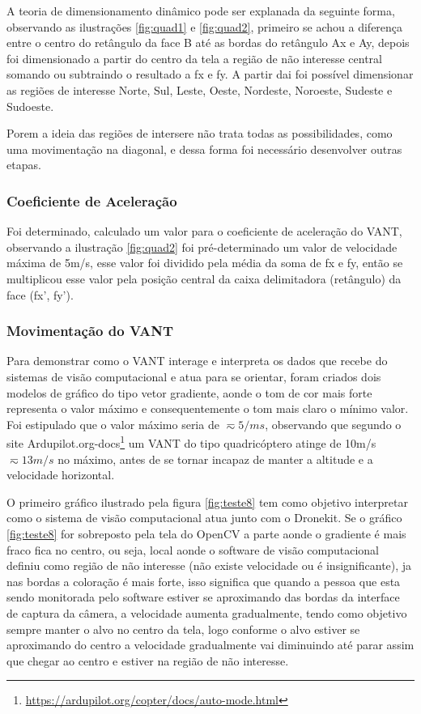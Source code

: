 A teoria de dimensionamento dinâmico pode ser explanada da seguinte forma, observando as ilustrações \ref{fig:quad1} e \ref{fig:quad2}, primeiro se achou a diferença entre o centro do retângulo da face B até as bordas do retângulo Ax e Ay, depois foi dimensionado a partir do centro da tela a região de não interesse central somando ou subtraindo o resultado a fx e fy. A partir dai foi possível dimensionar as regiões de interesse Norte, Sul, Leste, Oeste, Nordeste, Noroeste, Sudeste e Sudoeste.

Porem a ideia das regiões de intersere não trata todas as possibilidades, como uma movimentação na diagonal, e dessa forma foi necessário desenvolver outras etapas.

\subsubsection{Coeficiente de Aceleração}

Foi determinado, calculado um valor para o coeficiente de aceleração do VANT, observando a ilustração \ref{fig:quad2} foi pré-determinado um valor de velocidade máxima de 5m/s, esse valor foi dividido pela média da soma de fx e fy, então se multiplicou esse valor pela posição central da caixa delimitadora (retângulo) da face (fx', fy'). 

\subsubsection{Movimentação do VANT}

Para demonstrar como o VANT interage e interpreta os dados que recebe do sistemas de visão computacional e atua para se orientar, foram criados dois modelos de gráfico do tipo vetor gradiente, aonde o tom de cor mais forte representa o valor máximo e consequentemente o tom mais claro o mínimo valor. Foi estipulado que o valor máximo seria de $\displaystyle \eqsim 5/ms$, observando que segundo o site Ardupilot.org-docs\footnote{\url{https://ardupilot.org/copter/docs/auto-mode.html}} um VANT do tipo quadricóptero atinge de 10m/s $\displaystyle \eqsim13m/s$ no máximo, antes de se tornar incapaz de manter a altitude e a velocidade horizontal. 

O primeiro gráfico ilustrado pela figura \ref{fig:teste8} tem como objetivo interpretar como o sistema de visão computacional atua junto com o Dronekit. Se o gráfico \ref{fig:teste8} for sobreposto pela tela do OpenCV a parte aonde o gradiente é mais fraco fica no centro, ou seja, local aonde o software de visão computacional definiu como região de não interesse (não existe velocidade ou é insignificante), ja nas bordas a coloração é mais forte, isso significa que quando a pessoa que esta sendo monitorada pelo software estiver se aproximando  das bordas da interface de captura da câmera, a velocidade aumenta gradualmente, tendo como objetivo sempre manter o alvo no centro da tela, logo conforme o alvo estiver se aproximando do centro a velocidade gradualmente vai diminuindo até parar assim que chegar ao centro e estiver na região de não interesse.

